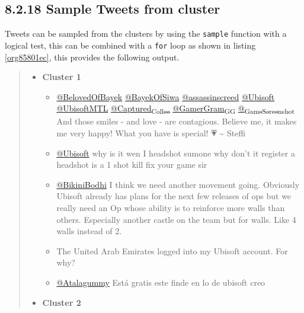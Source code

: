 \documentclass[11pt]{article}
\begin{document}
\subsection{8.2.18 Sample Tweets from cluster}
\label{sec:org45d07b2}
Tweets can be sampled from the clusters by using the \texttt{sample} function with a logical test, this can be combined with a \texttt{for} loop as shown in listing \ref{org85801ec}, this provides the following output.


\begin{quote}
\begin{itemize}
\item \textbf{Cluster 1}
\begin{itemize}
\item \href{https://twitter.com/search?q=\%40BelovedOfBayek\&src=typed\_query}{@BelovedOfBayek}
 \href{https://twitter.com/search?q=\%40BayekOfSiwa\&src=typed\_query}{@BayekOfSiwa} \href{https://twitter.com/search?q=\%40assassinscreed\&src=typed\_query}{@assassinscreed} \href{https://twitter.com/search?q=\%40Ubisoft\&src=typed\_query}{@Ubisoft} \href{https://twitter.com/search?q=\%40UbisoftMTL\&src=typed\_query}{@UbisoftMTL}
\href{https://twitter.com/search?q=\%40Captured\_Collec\&src=typed\_query}{@Captured\textsubscript{Collec}} \href{https://twitter.com/search?q=\%40GamerGram\_GG\&src=typed\_query}{@GamerGram\textsubscript{GG}} \href{https://twitter.com/search?q=\%40\_GameScreenshot\&src=typed\_query}{@\textsubscript{GameScreenshot}} And those smiles - and
love - are contagious. Believe me, it makes me very happy! What you have is
special! 💗 \textasciitilde{} Steffi
\item \href{https://twitter.com/search?q=\%40Ubisoft}{@Ubisoft} why is it wen I headshot sumone why don’t it register a headshot
is a 1 shot kill fix your game sir
\item \href{https://twitter.com/search?q=\%40BikiniBodhi}{@BikiniBodhi} I think we need another movement going. Obviously Ubisoft
already has plans for the next few releases of ops but we really need an Op
whose ability is to reinforce more walls than others. Especially another
castle on the team but for walls. Like 4 walls instead of 2.
\item The United Arab Emirates logged into my Ubisoft account. For why?
\item \href{https://twitter.com/search?q=\%40Atalagummy}{@Atalagummy} Está gratis este finde en lo de ubisoft creo
\end{itemize}
\item \textbf{Cluster 2}

\end{itemize}
\end{quote}
\end{document}
